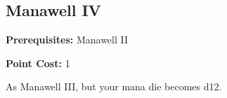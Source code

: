 \subsection{Manawell IV}\label{feat:manawell4}

\noindent
\textbf{Prerequisites:} Manawell II

\noindent
\textbf{Point Cost:} 1 

As Manawell III, but your mana die becomes d12.
